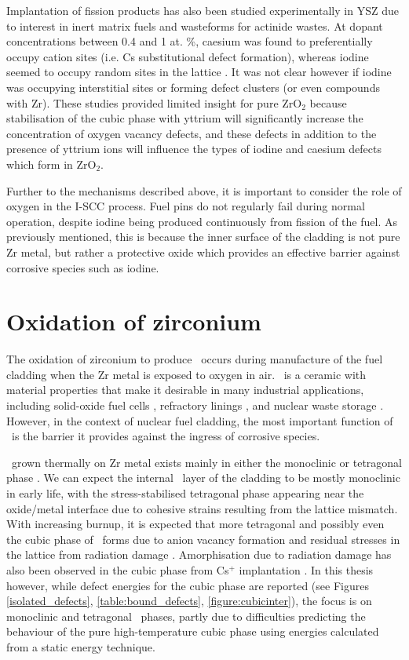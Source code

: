 Implantation of fission products has also been studied experimentally in YSZ due to interest in inert matrix fuels and wasteforms for actinide wastes. At dopant concentrations between 0.4 and 1 at. \%, caesium was found to preferentially occupy cation sites (i.e. Cs substitutional defect formation), whereas iodine seemed to occupy random sites in the lattice \cite{Thome1999}. It was not clear however if iodine was occupying interstitial sites or forming defect clusters (or even compounds with Zr). These studies provided limited insight for pure ZrO$_{2}$ because stabilisation of the cubic phase with yttrium will significantly increase the concentration of oxygen vacancy defects, and these defects in addition to the presence of yttrium ions will influence the types of iodine and caesium defects which form in ZrO$_{2}$.

Further to the mechanisms described above, it is important to consider the role of oxygen in the I-SCC process. Fuel pins do not regularly fail during normal operation, despite iodine being produced continuously from fission of the fuel. As previously mentioned, this is because the inner surface of the cladding is not pure Zr metal, but rather a protective oxide which provides an effective barrier against corrosive species such as iodine.

\section{Oxidation of zirconium}

The oxidation of zirconium to produce \zirconia\ occurs during manufacture of the fuel cladding when the Zr metal is exposed to oxygen in air. \zirconia\ is a ceramic with material properties that make it desirable in many industrial applications, including solid-oxide fuel cells \cite{radford1979zirconia}, refractory linings \cite{whittemore1952fused}, and nuclear waste storage \cite{wang2012ceramics}. However, in the context of nuclear fuel cladding, the most important function of \zirconia\ is the barrier it provides against the ingress of corrosive species. 

\zirconia\ grown thermally on Zr metal exists mainly in either the monoclinic or tetragonal phase \cite{Howard1988,teufer1962crystal}. We can expect the internal \zirconia\ layer of the cladding to be mostly monoclinic in early life, with the stress-stabilised tetragonal phase appearing near the oxide/metal interface due to cohesive strains resulting from the lattice mismatch. With increasing burnup, it is expected that more tetragonal and possibly even the cubic phase of \zirconia\ forms due to anion vacancy formation and residual stresses in the lattice from radiation damage \cite{sickafus1999radiation}. Amorphisation due to radiation damage has also been observed in the cubic phase from Cs$^{+}$ implantation \cite{amorphization2000wang}. In this thesis however, while defect energies for the cubic phase are reported (see Figures \ref{isolated_defects}, \ref{table:bound_defects}, \ref{figure:cubicinter}), the focus is on monoclinic and tetragonal \zirconia\ phases, partly due to difficulties predicting the behaviour of the pure high-temperature cubic phase using energies calculated from a static energy technique. 


